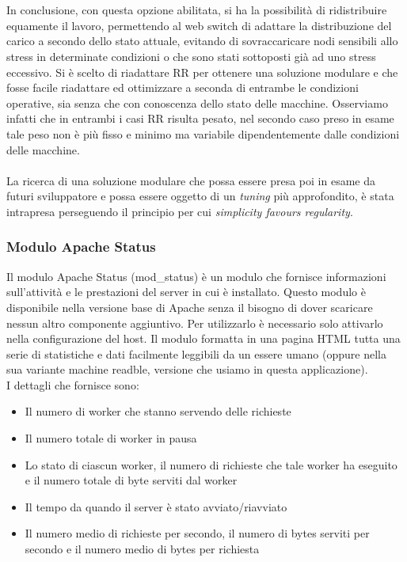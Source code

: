 \documentclass[italian]{tktltiki2}
\begin{document}
\\
\\
In conclusione, con questa opzione abilitata, si ha la possibilità di ridistribuire equamente il lavoro, permettendo al web switch di adattare la distribuzione del carico a secondo dello stato attuale, evitando di sovraccaricare nodi sensibili allo stress in determinate condizioni o che sono stati sottoposti già ad uno stress eccessivo. Si è scelto di riadattare RR per ottenere una soluzione modulare e che fosse facile riadattare ed ottimizzare a seconda di entrambe le condizioni operative, sia senza che con conoscenza dello stato delle macchine. Osserviamo infatti che in entrambi i casi RR risulta pesato, nel secondo caso preso in esame tale peso non è più fisso e minimo ma variabile dipendentemente dalle condizioni delle macchine.
\\
\\
La ricerca di una soluzione modulare che possa essere presa poi in esame da futuri sviluppatore e possa essere oggetto di un \emph{tuning} più approfondito, è stata intrapresa perseguendo il principio per cui \emph{simplicity favours regularity}.

\subsubsection{Modulo Apache Status}
\label{sssec:apachestatus}
Il modulo Apache Status (mod\_status)\cite{mod_status} è un modulo che fornisce informazioni sull'attività e le prestazioni del server in cui è installato. Questo modulo è disponibile nella versione base di Apache senza il bisogno di dover scaricare nessun altro componente aggiuntivo. Per utilizzarlo è necessario solo attivarlo nella configurazione del host. Il modulo formatta in una pagina HTML tutta una serie di statistiche e dati facilmente leggibili da un essere umano (oppure nella sua variante machine readble, versione che usiamo in questa applicazione).
\\
I dettagli che fornisce sono:

\begin{itemize}
  \item Il numero di worker che stanno servendo delle richieste
  \item Il numero totale di worker in pausa
  \item Lo stato di ciascun worker, il numero di richieste che tale worker ha eseguito e il numero totale di byte serviti dal worker
  \item Il tempo da quando il server è stato avviato/riavviato
  \item Il numero medio di richieste per secondo, il numero di bytes serviti per secondo e il numero medio di bytes per richiesta
\end{itemize}
\end{document}
